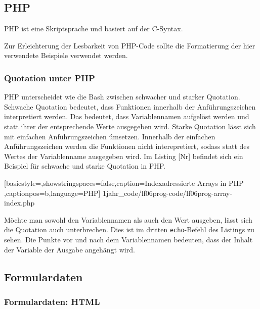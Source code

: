 \subsection{PHP}

PHP ist eine Skriptsprache und basiert auf der C-Syntax.

Zur Erleichterung der Lesbarkeit von PHP-Code sollte die Formatierung der hier verwendete Beispiele verwendet werden.

\subsubsection{Quotation unter PHP}

PHP unterscheidet wie die Bash zwischen schwacher und starker Quotation. Schwache Quotation bedeutet, dass Funktionen innerhalb der Anführungszeichen \" interpretiert werden. Das bedeutet, dass Variablennamen aufgelöst werden und statt ihrer der entsprechende Werte ausgegeben wird. Starke Quotation lässt sich mit einfachen Anführungszeichen \' umsetzen. Innerhalb der einfachen Anführungszeichen werden die Funktionen nicht interepretiert, sodass statt des Wertes der Variablenname ausgegeben wird. Im Listing [Nr] befindet sich ein Beispiel für schwache und starke Quotation in PHP.


	[basicstyle=\small,showstringspaces=false,caption={Indexadressierte Arrays in PHP}
	\label{lst:array-index},captionpos=b,language=PHP]
	{1jahr_code/lf06prog-code/lf06prog-array-index.php}
	
Möchte man sowohl den Variablennamen als auch den Wert ausgeben, lässt sich die Quotation auch unterbrechen. Dies ist im dritten \texttt{echo}-Befehl des Listings zu sehen. Die Punkte vor und nach dem Variablennamen bedeuten, dass der Inhalt der Variable der Ausgabe angehängt wird.


\subsection{Formulardaten}

\subsubsection{Formulardaten: HTML}


